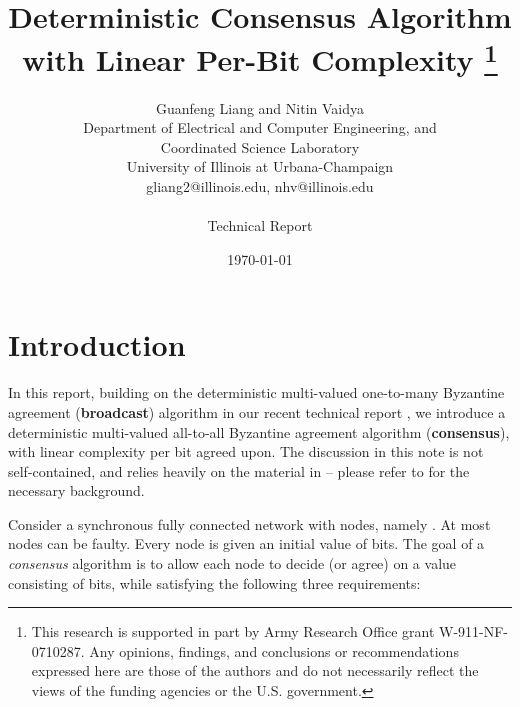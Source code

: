 \documentclass[12pt]{article}
\begin{document}
\title{Deterministic Consensus Algorithm\\ with Linear Per-Bit Complexity  \footnote{\normalsize This research is supported
in part by Army Research Office grant
W-911-NF-0710287. Any opinions, findings, and conclusions or recommendations expressed here are those of the authors and do not
necessarily reflect the views of the funding agencies or the U.S. government.}}


\date{\today}
\author{Guanfeng Liang and Nitin Vaidya\\ \normalsize Department of Electrical and Computer Engineering, and\\ \normalsize Coordinated Science Laboratory\\ \normalsize University of Illinois at Urbana-Champaign\\ \normalsize gliang2@illinois.edu, nhv@illinois.edu\\~\\Technical Report}







\maketitle


\thispagestyle{empty}

\newpage

\setcounter{page}{1}

\section{Introduction}
In this report, building on the deterministic multi-valued one-to-many Byzantine agreement ({\bf broadcast}) algorithm in our recent technical report
 \cite{techreport_BA_complexity}, we introduce a deterministic multi-valued all-to-all Byzantine agreement algorithm ({\bf consensus}), with linear complexity per bit agreed upon. The discussion in this note is not self-contained, and relies heavily on the material in \cite{techreport_BA_complexity} -- please refer to
\cite{techreport_BA_complexity} for the necessary background.

Consider a synchronous fully connected network with  nodes, namely . At most  nodes can be faulty. Every node  is given an initial value of  bits. The goal of a {\em consensus} algorithm is to allow each node to decide (or agree) on a value consisting of  bits,
 while satisfying the following three requirements:
\end{document}

